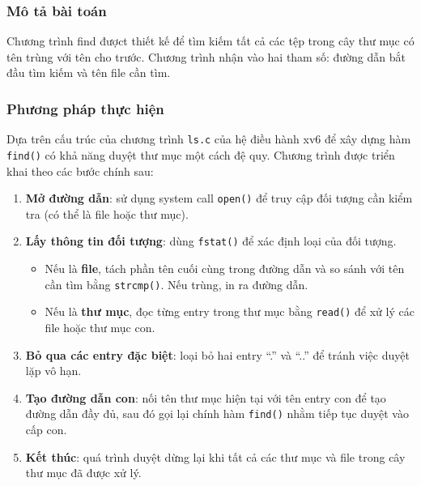 \subsubsection{Mô tả bài toán}
Chương trình find đượct thiết kế để tìm kiếm tất cả các tệp trong cây thư mục có tên trùng với tên cho trước. Chương trình nhận vào hai tham số: đường dẫn bắt đầu tìm kiếm và tên file cần tìm.

\subsubsection{Phương pháp thực hiện}
Dựa trên cấu trúc của chương trình \texttt{ls.c} của hệ điều hành xv6 để xây dựng hàm \texttt{find()} có khả năng duyệt thư mục một cách đệ quy. 
Chương trình được triển khai theo các bước chính sau:

\begin{enumerate}
    \item \textbf{Mở đường dẫn}: sử dụng system call \texttt{open()} để truy cập đối tượng cần kiểm tra (có thể là file hoặc thư mục).
    
    \item \textbf{Lấy thông tin đối tượng}: dùng \texttt{fstat()} để xác định loại của đối tượng. 
    \begin{itemize}
        \item Nếu là \textbf{file}, tách phần tên cuối cùng trong đường dẫn và so sánh với tên cần tìm bằng \texttt{strcmp()}. Nếu trùng, in ra đường dẫn.
        \item Nếu là \textbf{thư mục}, đọc từng entry trong thư mục bằng \texttt{read()} để xử lý các file hoặc thư mục con.
    \end{itemize}

    \item \textbf{Bỏ qua các entry đặc biệt}: loại bỏ hai entry ``.'' và ``..'' để tránh việc duyệt lặp vô hạn.

    \item \textbf{Tạo đường dẫn con}: nối tên thư mục hiện tại với tên entry con để tạo đường dẫn đầy đủ, sau đó gọi lại chính hàm \texttt{find()} nhằm tiếp tục duyệt vào cấp con.

    \item \textbf{Kết thúc}: quá trình duyệt dừng lại khi tất cả các thư mục và file trong cây thư mục đã được xử lý.
\end{enumerate}

